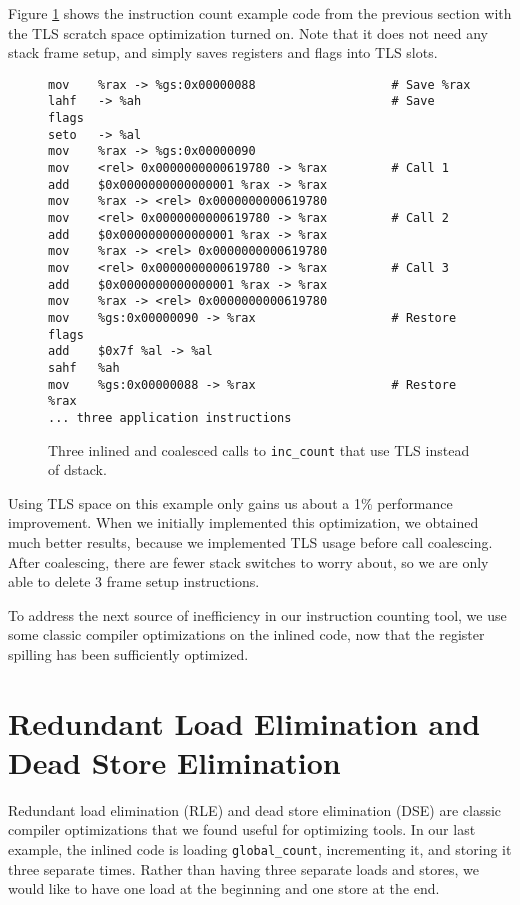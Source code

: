 Figure \ref{fig:inscount_tls} shows the instruction count example code from the
previous section with the TLS scratch space optimization turned on.  Note that
it does not need any stack frame setup, and simply saves registers and flags
into TLS slots.

\begin{figure}
\begin{verbatim}
mov    %rax -> %gs:0x00000088                   # Save %rax
lahf   -> %ah                                   # Save flags
seto   -> %al 
mov    %rax -> %gs:0x00000090 
mov    <rel> 0x0000000000619780 -> %rax         # Call 1
add    $0x0000000000000001 %rax -> %rax 
mov    %rax -> <rel> 0x0000000000619780 
mov    <rel> 0x0000000000619780 -> %rax         # Call 2
add    $0x0000000000000001 %rax -> %rax 
mov    %rax -> <rel> 0x0000000000619780 
mov    <rel> 0x0000000000619780 -> %rax         # Call 3
add    $0x0000000000000001 %rax -> %rax 
mov    %rax -> <rel> 0x0000000000619780 
mov    %gs:0x00000090 -> %rax                   # Restore flags
add    $0x7f %al -> %al 
sahf   %ah 
mov    %gs:0x00000088 -> %rax                   # Restore %rax
... three application instructions
\end{verbatim}
\caption{Three inlined and coalesced calls to {\tt inc\_count} that use TLS
instead of dstack.}
\label{fig:inscount_tls}
\end{figure}

Using TLS space on this example only gains us about a 1\% performance
improvement.  When we initially implemented this optimization, we obtained much
better results, because we implemented TLS usage before call coalescing.  After
coalescing, there are fewer stack switches to worry about, so we are only able
to delete 3 frame setup instructions.

To address the next source of inefficiency in our instruction counting tool, we
use some classic compiler optimizations on the inlined code, now that the
register spilling has been sufficiently optimized.

\section{Redundant Load Elimination and Dead Store Elimination}

Redundant load elimination (RLE) and dead store elimination (DSE) are classic
compiler optimizations that we found useful for optimizing tools.  In our last
example, the inlined code is loading {\tt global\_count}, incrementing it, and
storing it three separate times.  Rather than having three separate loads and
stores, we would like to have one load at the beginning and one store at the
end.

